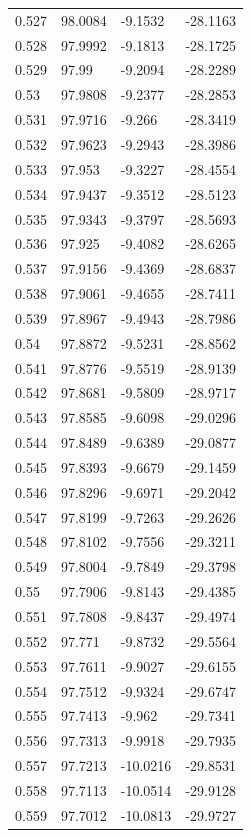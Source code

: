 \begin{tabular}{llll}
0.527 & 98.0084 & -9.1532 & -28.1163 \\
0.528 & 97.9992 & -9.1813 & -28.1725 \\
0.529 & 97.99 & -9.2094 & -28.2289 \\
0.53 & 97.9808 & -9.2377 & -28.2853 \\
0.531 & 97.9716 & -9.266 & -28.3419 \\
0.532 & 97.9623 & -9.2943 & -28.3986 \\
0.533 & 97.953 & -9.3227 & -28.4554 \\
0.534 & 97.9437 & -9.3512 & -28.5123 \\
0.535 & 97.9343 & -9.3797 & -28.5693 \\
0.536 & 97.925 & -9.4082 & -28.6265 \\
0.537 & 97.9156 & -9.4369 & -28.6837 \\
0.538 & 97.9061 & -9.4655 & -28.7411 \\
0.539 & 97.8967 & -9.4943 & -28.7986 \\
0.54 & 97.8872 & -9.5231 & -28.8562 \\
0.541 & 97.8776 & -9.5519 & -28.9139 \\
0.542 & 97.8681 & -9.5809 & -28.9717 \\
0.543 & 97.8585 & -9.6098 & -29.0296 \\
0.544 & 97.8489 & -9.6389 & -29.0877 \\
0.545 & 97.8393 & -9.6679 & -29.1459 \\
0.546 & 97.8296 & -9.6971 & -29.2042 \\
0.547 & 97.8199 & -9.7263 & -29.2626 \\
0.548 & 97.8102 & -9.7556 & -29.3211 \\
0.549 & 97.8004 & -9.7849 & -29.3798 \\
0.55 & 97.7906 & -9.8143 & -29.4385 \\
0.551 & 97.7808 & -9.8437 & -29.4974 \\
0.552 & 97.771 & -9.8732 & -29.5564 \\
0.553 & 97.7611 & -9.9027 & -29.6155 \\
0.554 & 97.7512 & -9.9324 & -29.6747 \\
0.555 & 97.7413 & -9.962 & -29.7341 \\
0.556 & 97.7313 & -9.9918 & -29.7935 \\
0.557 & 97.7213 & -10.0216 & -29.8531 \\
0.558 & 97.7113 & -10.0514 & -29.9128 \\
0.559 & 97.7012 & -10.0813 & -29.9727 \\

\end{tabular}

